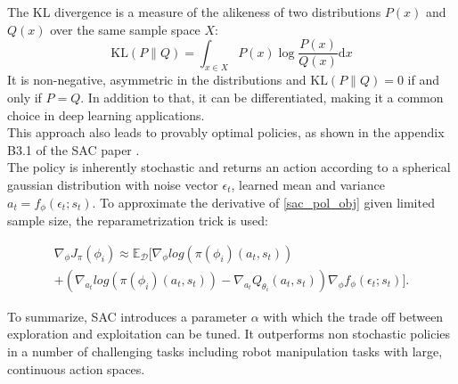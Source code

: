 The KL divergence is a measure of the alikeness of two distributions $P(x)$ and $Q(x)$ over the same sample space $X$:
\begin{equation}
    \label{KL}
    \mathrm{KL}(P\|Q) = \int_{x\in X} P(x) \log \frac{P(x)}{Q(x)} \mathrm{d}x
\end{equation}
It is non-negative, asymmetric in the distributions and $\mathrm{KL}(P\|Q) = 0$ if and only if $P = Q$. In addition to that, it can be differentiated, making it 
a common choice in deep learning applications.\\

This approach also leads to provably optimal policies, as shown in the appendix B3.1 of the SAC paper \cite{haarnoja2018soft}. \\
The policy is inherently stochastic and returns an action according to a spherical gaussian distribution with noise vector $\epsilon_t$, learned mean and variance $a_t = f_{\phi}(\epsilon_t;s_t)$. 
To approximate the derivative of \ref{sac_pol_obj} given limited sample size, the reparametrization trick is used:

\begin{equation}
    \label{SAC_update_rule}
    \begin{align}
        \nabla_{\phi}J_\pi(\phi_{i}) \approx \mathbb{E}_{\mathcal{D}} [\nabla_{\phi} log (\pi(\phi_{i})(a_t, s_t))\\
        + \left( \nabla_{a_t} log (\pi(\phi_{i})(a_t, s_t)) - \nabla_{a_t} Q_{\theta_i}(a_t, s_t) \right) \nabla_{\phi} f_{\phi}(\epsilon_t;s_t)].
    \end{align}
\end{equation}



To summarize, SAC introduces a parameter $\alpha$ with which the trade off between exploration and exploitation can be tuned. It outperforms non stochastic 
policies in a number of challenging tasks including robot manipulation tasks with large, continuous action spaces.

